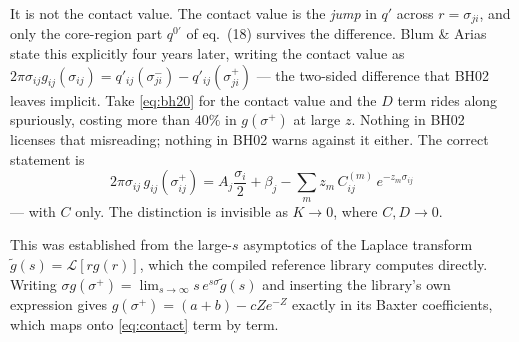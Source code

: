 \documentclass[11pt,a4paper]{article}
\newcommand{\eqBH}[1]{eq.~(#1)}
\begin{document}
It is not the contact value. The contact value is the \emph{jump} in $q'$
across $r=\sigma_{ji}$, and only the core-region part $q^{0\prime}$ of
\eqBH{18} survives the difference. Blum \& Arias state this explicitly four
years later, writing the contact value as
$2\pi\sigma_{ij}g_{ij}(\sigma_{ij})=q'_{ij}(\sigma^-_{ji})-q'_{ij}(\sigma^+_{ji})$
--- the two-sided difference that BH02 leaves implicit. Take
\eqref{eq:bh20} for the contact value and the $D$ term rides along
spuriously, costing more than $40\%$ in $g(\sigma^+)$ at large $z$. Nothing in
BH02 licenses that misreading; nothing in BH02 warns against it either. The
correct statement is
\begin{equation}
  \boxed{\;2\pi\sigma_{ij}\,g_{ij}(\sigma_{ij}^+)=A_j\frac{\sigma_i}{2}+\beta_j
   -\sum_m z_m\,C^{(m)}_{ij}\,e^{-z_m\sigma_{ij}}\;}
  \label{eq:contact}
\end{equation}
--- with $C$ only. The distinction is invisible as $K\to0$, where $C,D\to0$.

This was established from the large-$s$ asymptotics of the Laplace transform
$\tilde g(s)=\mathcal L[r g(r)]$, which the compiled reference library computes
directly. Writing $\sigma g(\sigma^+)=\lim_{s\to\infty}s\,e^{s\sigma}\tilde
g(s)$ and inserting the library's own expression gives
$g(\sigma^+)=(a+b)-cZe^{-Z}$ exactly in its Baxter coefficients, which maps
onto \eqref{eq:contact} term by term.
\end{document}
